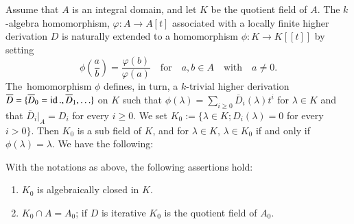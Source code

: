 \subsubsection{}\label{chap1:1.3.2}
Assume that $A$ is an integral domain, and let $K$ be the quotient
field of $A$. The $k$-algebra homomorphism, $\varphi:A\to A[t]$
associated with a locally finite higher derivation $D$ is naturally
extended to a homomorphism $\phi:K\to K[[t]]$ by setting
$$
\phi\left(\frac{a}{b}\right)=\frac{\varphi(b)}{\varphi(a)}\quad\text{for}\quad
a,b\in A\quad\text{with}\quad a\neq 0.
$$
The\pageoriginale\ homomorphism $\phi$ defines, in turn, a $k$-trivial
higher derivation
$\overline{D}=\{\overline{D}_{0}=\operatorname{id}.,\overline{D}_{1},\ldots\}$ on
$K$ such that $\phi(\lambda)=\sum\limits_{i\geq
  0}\overline{D}_{i}(\lambda)t^{i}$ for $\lambda\in K$ and that
$\overline{D}_{i}|_{A}=D_{i}$ for every $i\geq 0$. We set
$K_{0}:=\{\lambda\in K;D_{i}(\lambda)=0$ for every $i>0\}$. Then
$K_{0}$ is a sub field of $K$, and for $\lambda\in K$, $\lambda\in
K_{0}$ if and only if $\phi(\lambda)=\lambda$. We have the following:

\begin{lemma*}
  With the notations as above, the following assertions hold:
  \begin{enumerate}
    \renewcommand{\labelenumi}{\rm(\theenumi)}
  \item $K_{0}$ is algebraically closed in $K$.
    
  \item $K_{0}\cap A=A_{0}$; if $D$ is iterative $K_{0}$ is the quotient
    field of $A_{0}$.
  \end{enumerate}
\end{lemma*}

